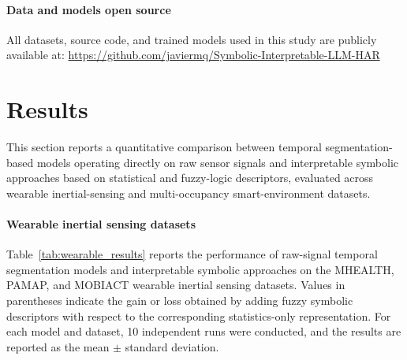\documentclass[preprint,12pt]{elsarticle}
\begin{document}
\paragraph{Data and models open source}
All datasets, source code, and trained models used in this study are publicly available at:
\url{https://github.com/javiermq/Symbolic-Interpretable-LLM-HAR}


\section{Results}
\label{sec:results}

This section reports a quantitative comparison between temporal segmentation-based models operating directly on raw sensor signals and interpretable symbolic approaches based on statistical and fuzzy-logic descriptors, evaluated across wearable inertial-sensing and multi-occupancy smart-environment datasets.

\paragraph{Wearable inertial sensing datasets}

Table~\ref{tab:wearable_results} reports the performance of raw-signal temporal segmentation models and interpretable symbolic approaches on the MHEALTH, PAMAP, and MOBIACT wearable inertial sensing datasets. Values in parentheses indicate the gain or loss obtained by adding fuzzy symbolic descriptors with respect to the corresponding statistics-only representation. For each model and dataset, 10 independent runs were conducted, and the results are reported as the mean $\pm$ standard deviation. 
\end{document}
